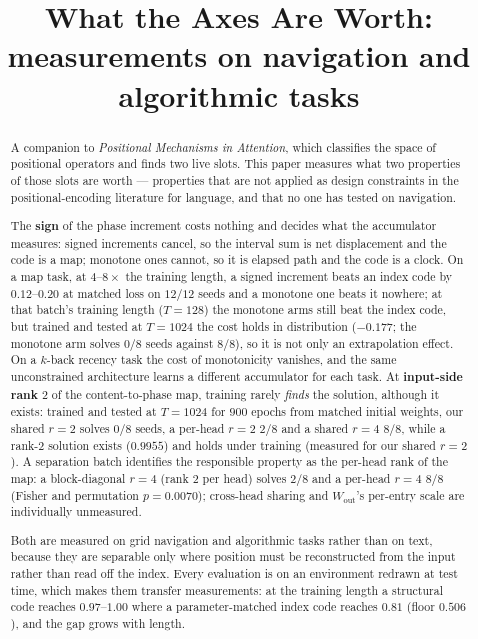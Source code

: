 \documentclass[11pt]{article}
\title{What the Axes Are Worth:\\
\large measurements on navigation and algorithmic tasks}
\date{}
\author{}
\begin{document}
\maketitle

\begin{abstract}
\noindent
A companion to \emph{Positional Mechanisms in Attention}, which classifies the space
of positional operators and finds two live slots. This paper measures what two
properties of those slots are worth --- properties that are not applied as design
constraints in the positional-encoding literature for language, and that no one has
tested on navigation.

The \textbf{sign} of the phase increment costs nothing and decides what the
accumulator measures: signed increments cancel, so the interval sum is net
displacement and the code is a map; monotone ones cannot, so it is elapsed path and
the code is a clock. On a map task, at $4$--$8\times$ the training length, a signed
increment beats an index code by $0.12$--$0.20$ at matched loss on $12/12$ seeds and a
monotone one beats it nowhere; at that batch's training length ($T=128$) the monotone arms
still beat the index code, but trained and tested at $T=1024$ the cost holds in
distribution ($-0.177$; the monotone arm solves $0/8$ seeds against $8/8$), so it is not
only an extrapolation effect. On a $k$-back recency task
the cost of monotonicity vanishes, and the same unconstrained architecture learns a
different accumulator for each task. At \textbf{input-side rank} $2$ of the
content-to-phase map, training rarely \emph{finds} the solution, although it
exists: trained and tested at $T=1024$ for $900$ epochs from matched initial
weights, our shared $r=2$ solves $0/8$ seeds, a per-head $r=2$ $2/8$ and a shared
$r=4$ $8/8$, while a rank-$2$ solution exists ($0.9955$) and holds under training
(measured for our shared $r=2$). A separation batch identifies the responsible property
as the per-head rank of the map: a block-diagonal $r=4$ (rank $2$ per head) solves $2/8$
and a per-head $r=4$ $8/8$ (Fisher and permutation $p=0.0070$); cross-head sharing and
$W_{\mathrm{out}}$'s per-entry scale are individually unmeasured.

Both are measured on grid navigation and algorithmic tasks rather than on text,
because they are separable only where position must be reconstructed from the input
rather than read off the index. Every evaluation is on an environment redrawn at test
time, which makes them transfer measurements: at the training length a structural code
reaches $0.97$--$1.00$ where a parameter-matched index code reaches $0.81$ (floor
$0.506$), and the gap grows with length.


\end{abstract}
\end{document}
